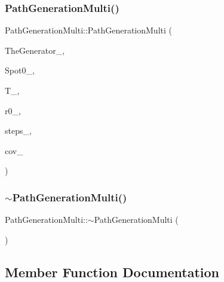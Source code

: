 \subsubsection{\texorpdfstring{Path\+Generation\+Multi()}{PathGenerationMulti()}}
{\footnotesize\ttfamily Path\+Generation\+Multi\+::\+Path\+Generation\+Multi (\begin{DoxyParamCaption}\item[{shared\+\_\+ptr$<$ \hyperlink{classRandomBase}{Random\+Base} $>$ \&}]{The\+Generator\+\_\+,  }\item[{const \hyperlink{classMJArray}{M\+J\+Array} \&}]{Spot0\+\_\+,  }\item[{double}]{T\+\_\+,  }\item[{const \hyperlink{classMJArray}{M\+J\+Array} \&}]{r0\+\_\+,  }\item[{unsigned long}]{steps\+\_\+,  }\item[{matrix$<$ double $>$}]{cov\+\_\+ }\end{DoxyParamCaption})}

\hypertarget{classPathGenerationMulti_a270bb66f379b62d5af8f8d4e218127f0}{}\label{classPathGenerationMulti_a270bb66f379b62d5af8f8d4e218127f0} 
\subsubsection{\texorpdfstring{$\sim$\+Path\+Generation\+Multi()}{~PathGenerationMulti()}}
{\footnotesize\ttfamily Path\+Generation\+Multi\+::$\sim$\+Path\+Generation\+Multi (\begin{DoxyParamCaption}{ }\end{DoxyParamCaption})\hspace{0.3cm}{\ttfamily [inline]}}



\subsection{Member Function Documentation}
\hypertarget{classPathGenerationMulti_aca9ffcbef7f0ae7e00177104b97abbf1}{}\label{classPathGenerationMulti_aca9ffcbef7f0ae7e00177104b97abbf1} 
